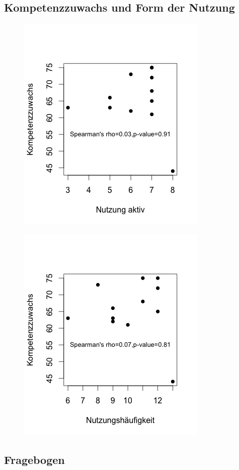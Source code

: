 \documentclass[12pt, bibliography=totoc]{scrartcl}
\begin{document}
  \subsection{Kompetenzzuwachs und Form der Nutzung}
  \label{sec:aktiv}
  \begin{figure}[H]
\includegraphics[width=0.5\linewidth]{Anhang/spearaktiv.png}
\end{figure}
\begin{figure}[H]
\includegraphics[width=0.5\linewidth]{Anhang/speerpassiv.png}
\end{figure}
\subsection{Fragebogen}
\label{sec:fragen}



%
%
\end{document}
